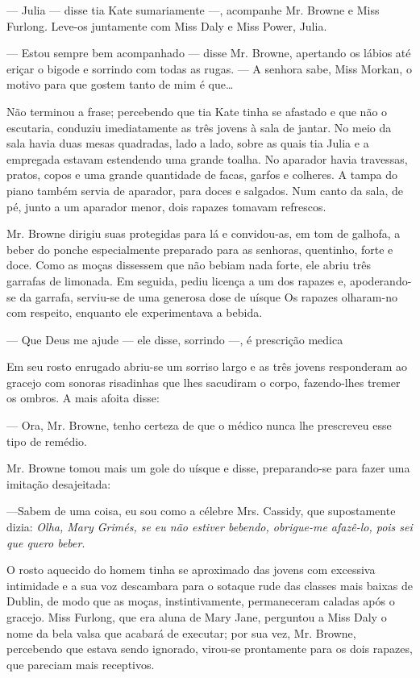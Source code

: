 --- Julia --- disse tia Kate sumariamente ---, acompanhe Mr. Browne e
Miss Furlong. Leve-os juntamente com Miss Daly e Miss Power, Julia.

--- Estou sempre bem acompanhado --- disse Mr. Browne, apertando
os lábios até eriçar o bigode e sorrindo com todas as rugas. --- A
senhora sabe, Miss Morkan, o motivo para que gostem tanto de mim é
que\ldots{}

Não terminou a frase; percebendo que tia Kate tinha se
afastado e que não o escutaria, conduziu imediatamente as
três jovens à sala de jantar. No meio da sala havia duas mesas
quadradas, lado a lado, sobre as quais tia Julia e a
empregada estavam estendendo uma grande toalha. No aparador
havia travessas, pratos, copos e uma grande quantidade de
facas, garfos e colheres. A tampa do piano também servia de
aparador, para doces e salgados. Num canto da sala, de pé,
junto a um aparador menor, dois rapazes tomavam refrescos.

Mr. Browne dirigiu suas protegidas para lá e convidou-as, em tom de
galhofa, a beber do ponche especialmente preparado para as senhoras,
quentinho, forte e doce. Como as moças dissessem que não bebiam nada
forte, ele abriu três garrafas de limonada. Em seguida, pediu licença a
um dos rapazes e, apoderando-se da garrafa, serviu-se de uma generosa
dose de uísque Os rapazes olharam-no com respeito, enquanto ele
experimentava a bebida.

--- Que Deus me ajude --- ele disse, sorrindo ---, é prescrição medica

Em seu rosto enrugado abriu-se um sorriso largo e as três jovens
responderam ao gracejo com sonoras risadinhas que lhes sacudiram o
corpo, fazendo-lhes tremer os ombros. A mais afoita disse:

--- Ora, Mr. Browne, tenho certeza de que o médico nunca lhe
prescreveu esse tipo de remédio.

Mr. Browne tomou mais um gole do uísque e disse,
preparando-se para fazer uma imitação desajeitada:

---Sabem de uma coisa, eu sou como a célebre Mrs. Cassidy, que
supostamente dizia: \textit{Olha, Mary Grimés, se eu não estiver bebendo,
obrigue-me afazê-lo, pois sei que quero beber}.

O rosto aquecido do homem tinha se aproximado das jovens com excessiva
intimidade e a sua voz descambara para o sotaque rude das classes mais
baixas de Dublin, de modo que as moças, instintivamente, permaneceram
caladas após o gracejo. Miss Furlong, que era aluna de Mary Jane,
perguntou a Miss Daly o nome da bela valsa que acabará de executar;
por sua vez, Mr. Browne, percebendo que estava sendo ignorado,
virou-se prontamente para os dois rapazes, que pareciam mais
receptivos.

